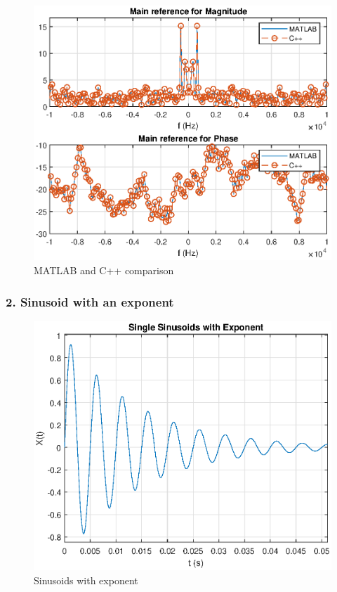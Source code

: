 \begin{refsection}
\begin{figure}[h]
	\centering
	\includegraphics[width=12cm]{./algorithms/fft/figures/random_noise_fft.eps}
	\caption{MATLAB and C++ comparison}\label{random_noise_fft}
\end{figure}

\newpage
\subsubsection{2. Sinusoid with an exponent}

\begin{figure}[h]
	\centering
	\includegraphics[width=12cm]{./algorithms/fft/figures/Single_sinusoid.eps}
	\caption{Sinusoids with exponent}\label{Single_sinusoid}
\end{figure}


\end{refsection}
